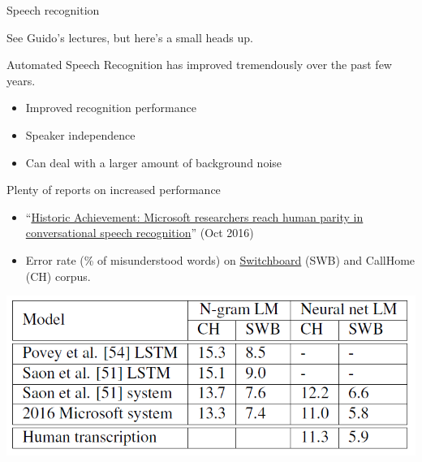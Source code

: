 \documentclass[compress]{beamer}
\begin{document}
\begin{frame}{Speech recognition}

    See Guido's lectures, but here's a small heads up.

    Automated Speech Recognition has improved tremendously over the past few
    years.

    \begin{itemize}
        \item Improved recognition performance
        \item Speaker independence
        \item Can deal with a larger amount of background noise
    \end{itemize}

    Plenty of reports on increased performance

\begin{itemize}

\item
  ``\href{https://blogs.microsoft.com/next/2016/10/18/historic-achievement-microsoft-researchers-reach-human-parity-conversational-speech-recognition/\#g5qKXHrZZ2pbxuPH.99}{Historic
  Achievement: Microsoft researchers reach human parity in
  conversational speech recognition}'' (Oct 2016)
\item
  Error rate (\% of misunderstood words) on
  \href{https://catalog.ldc.upenn.edu/LDC2004S13}{Switchboard} (SWB) and
  CallHome (CH) corpus.
\end{itemize}

    \begin{center}
        \includegraphics[width=0.8\linewidth]{asr-error-rates}
    \end{center}

\end{frame}
\end{document}
